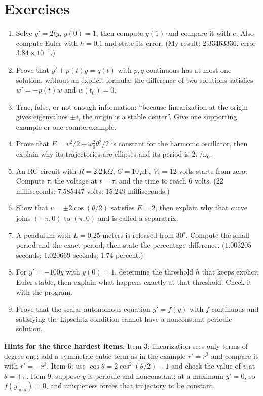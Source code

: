 \section{Exercises}
\begin{latihan}
\begin{enumerate}
\item Solve $y'=2ty$, $y(0)=1$, then compute $y(1)$ and compare it with
  $e$. Also compute Euler with $h=0.1$ and state its error. (My result:
  $2.33463336$, error $3.84\times10^{-1}$.)
\item Prove that $y'+p(t)y=q(t)$ with $p,q$ continuous has at most
  one solution, without an explicit formula: the difference of two solutions satisfies
  $w'=-p(t)w$ and $w(t_{0})=0$.
\item True, false, or not enough information: ``because linearization at the origin gives
  eigenvalues $\pm i$, the origin is a stable center''. Give one supporting example
  or one counterexample.
\item Prove that $E=v^{2}/2+\omega_{0}^{2}\theta^{2}/2$ is constant for the harmonic
  oscillator, then explain why its trajectories are ellipses and its period is
  $2\pi/\omega_{0}$.
\item An RC circuit with $R=2.2\,\mathrm{k}\Omega$, $C=10\,\mu\mathrm{F}$,
  $V_{s}=12$ volts starts from zero. Compute $\tau$, the voltage at $t=\tau$, and
  the time to reach $6$ volts. ($22$ milliseconds; $7.585447$ volts; $15.249$ milliseconds.)
\item Show that $v=\pm2\cos(\theta/2)$ satisfies $E=2$, then explain
  why that curve joins $(-\pi,0)$ to $(\pi,0)$ and is called a
  separatrix.
\item A pendulum with $L=0.25$ meters is released from $30^{\circ}$. Compute the small
  period and the exact period, then state the percentage difference. ($1.003205$ seconds;
  $1.020669$ seconds; $1.74$ percent.)
\item For $y'=-100y$ with $y(0)=1$, determine the threshold $h$ that keeps explicit Euler
  stable, then explain what happens exactly at that threshold.
  Check it with the program.
\item Prove that the scalar autonomous equation $y'=f(y)$ with $f$ continuous and
  satisfying the Lipschitz condition cannot have a nonconstant periodic solution.
\end{enumerate}

\textbf{Hints for the three hardest items.} Item 3: linearization sees only terms
of degree one; add a symmetric cubic term as in the example $r'=r^{3}$
and compare it with $r'=-r^{3}$. Item 6: use
$\cos\theta=2\cos^{2}(\theta/2)-1$ and check the value of $v$ at $\theta=\pm\pi$.
Item 9: suppose $y$ is periodic and nonconstant; at a maximum $y'=0$, so
$f(y_{\max})=0$, and uniqueness forces that trajectory to be constant.
\end{latihan}

